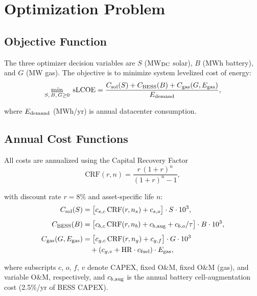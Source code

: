 \documentclass[conference]{IEEEtran}
\begin{document}
\section{Optimization Problem}
\label{sec:opt}

\subsection{Objective Function}

The three optimizer decision variables are $S$ (MW$_{\rm DC}$ solar),
$B$ (MWh battery), and $G$ (MW gas).
The objective is to minimize system levelized cost of energy:
%
\begin{equation}
  \min_{S,\,B,\,G \geq 0}
  \;\mathrm{sLCOE}
  = \frac{C_{\rm sol}(S)+C_{\rm BESS}(B)+C_{\rm gas}(G,E_{\rm gas})}
         {E_{\rm demand}},
  \label{eq:obj}
\end{equation}

\noindent where $E_{\rm demand}$ (MWh/yr) is annual datacenter consumption.

\subsection{Annual Cost Functions}

All costs are annualized using the Capital Recovery Factor
%
\begin{equation}
  \mathrm{CRF}(r,n)
    = \frac{r\,(1+r)^n}{(1+r)^n - 1},
  \label{eq:crf}
\end{equation}

\noindent with discount rate $r=8\%$ and asset-specific life $n$:
%
\begin{align}
  C_{\rm sol}(S)
    &= \bigl[c_{s,c}\,\mathrm{CRF}(r,n_s)
            + c_{s,o}\bigr]\cdot S \cdot 10^3,
  \label{eq:csol} \\[4pt]
  C_{\rm BESS}(B)
    &= \bigl[c_{b,c}\,\mathrm{CRF}(r,n_b)
            + c_{b,{\rm aug}}
            + c_{b,o}/\tau\bigr]\cdot B \cdot 10^3,
  \label{eq:cbess} \\[4pt]
  C_{\rm gas}(G,E_{\rm gas})
    &= \bigl[c_{g,c}\,\mathrm{CRF}(r,n_g)
            + c_{g,f}\bigr]\cdot G \cdot 10^3 \nonumber \\
    &\quad + (c_{g,v} + \mathrm{HR}\cdot c_{\rm fuel})\cdot E_{\rm gas},
  \label{eq:cgas}
\end{align}

\noindent where subscripts $c$, $o$, $f$, $v$ denote CAPEX, fixed O\&M,
fixed O\&M (gas), and variable O\&M, respectively, and $c_{b,{\rm aug}}$
is the annual battery cell-augmentation cost (2.5\%/yr of BESS CAPEX).
\end{document}
